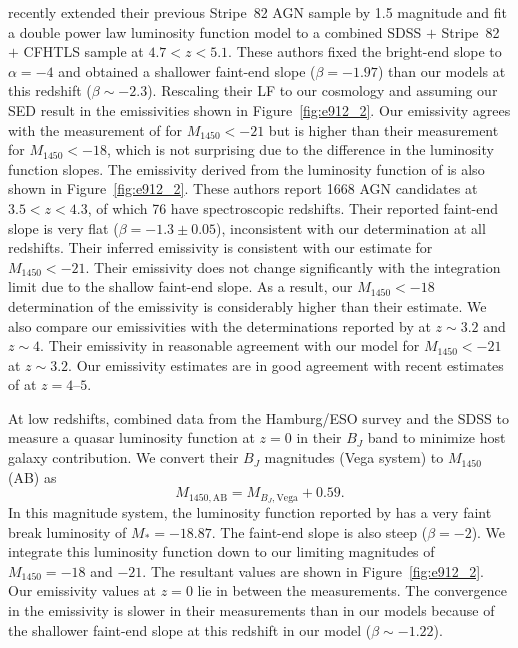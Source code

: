 \documentclass[fleqn,usenatbib]{mnras}
\begin{document}
\citet{2018AJ....155..131M} recently extended their previous Stripe~82
AGN sample by 1.5 magnitude and fit a double power law luminosity
function model to a combined SDSS $+$ Stripe~82 $+$ CFHTLS sample at
$4.7 < z < 5.1$.  These authors fixed the bright-end slope to
$\alpha=-4$ and obtained a shallower faint-end slope ($\beta=-1.97$)
than our models at this redshift ($\beta\sim -2.3$).  Rescaling their
LF to our cosmology and assuming our SED result in the emissivities
shown in Figure~\ref{fig:e912_2}.  Our emissivity agrees with the
measurement of \citet{2018AJ....155..131M} for $M_{1450}<-21$ but is
higher than their measurement for $M_{1450}<-18$, which is not
surprising due to the difference in the luminosity function slopes.
The emissivity derived from the luminosity function of
\citet{2018PASJ...70S..34A} is also shown in Figure~\ref{fig:e912_2}.
These authors report 1668 AGN candidates at $3.5<z<4.3$, of which 76
have spectroscopic redshifts.  Their reported faint-end slope is very
flat ($\beta=-1.3\pm 0.05$), inconsistent with our determination at
all redshifts.  Their inferred emissivity is consistent with our
estimate for $M_{1450}< -21$.  Their emissivity does not change
significantly with the integration limit due to the shallow faint-end
slope.  As a result, our $M_{1450}< -18$ determination of the
emissivity is considerably higher than their estimate.  We also
compare our emissivities with the determinations reported by
\citet{2012ApJ...755..169M} at $z\sim 3.2$ and $z\sim 4$.  Their
emissivity in reasonable agreement with our model for $M_{1450}<-21$
at $z\sim 3.2$.  Our emissivity estimates are in good agreement with
recent estimates of \citet{2018MNRAS.474.2904P} at $z=4$--$5$.

At low redshifts, \citet{2009A&A...507..781S} combined data from the
Hamburg/ESO survey and the SDSS to measure a quasar luminosity
function at $z=0$ in their $B_J$ band to minimize host galaxy
contribution.  We convert their $B_J$ magnitudes (Vega system) to
$M_{1450}$ (AB) as
\begin{equation}
  M_{1450,\mathrm{AB}}=M_{B_J, \mathrm{Vega}}+0.59.  
\end{equation}
In this magnitude system, the luminosity function reported by
\citet{2009A&A...507..781S} has a very faint break luminosity of
$M_*=-18.87$.  The faint-end slope is also steep ($\beta=-2$).  We
integrate this luminosity function down to our limiting magnitudes of
$M_{1450}=-18$ and $-21$.  The resultant values are shown in
Figure~\ref{fig:e912_2}.  Our emissivity values at $z=0$ lie in
between the \citet{2009A&A...507..781S} measurements.  The convergence
in the emissivity is slower in their measurements than in our models
because of the shallower faint-end slope at this redshift in our model
($\beta\sim -1.22$).  
\end{document}

